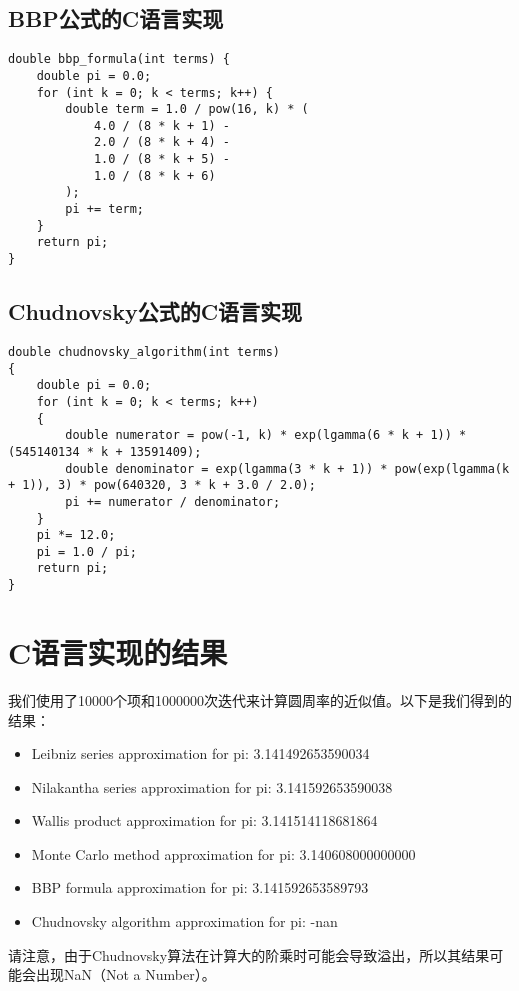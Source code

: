 \documentclass{ctexart}
\begin{document}
\subsection{BBP公式的C语言实现}
\begin{lstlisting}
double bbp_formula(int terms) {
    double pi = 0.0;
    for (int k = 0; k < terms; k++) {
        double term = 1.0 / pow(16, k) * (
            4.0 / (8 * k + 1) -
            2.0 / (8 * k + 4) -
            1.0 / (8 * k + 5) -
            1.0 / (8 * k + 6)
        );
        pi += term;
    }
    return pi;
}
\end{lstlisting}

\subsection{Chudnovsky公式的C语言实现}
\begin{lstlisting}
double chudnovsky_algorithm(int terms)
{
    double pi = 0.0;
    for (int k = 0; k < terms; k++)
    {
        double numerator = pow(-1, k) * exp(lgamma(6 * k + 1)) * (545140134 * k + 13591409);
        double denominator = exp(lgamma(3 * k + 1)) * pow(exp(lgamma(k + 1)), 3) * pow(640320, 3 * k + 3.0 / 2.0);
        pi += numerator / denominator;
    }
    pi *= 12.0;
    pi = 1.0 / pi;
    return pi;
}
\end{lstlisting}
\section{C语言实现的结果}

我们使用了10000个项和1000000次迭代来计算圆周率的近似值。以下是我们得到的结果：

\begin{itemize}
    \item Leibniz series approximation for pi: 3.141492653590034
    \item Nilakantha series approximation for pi: 3.141592653590038
    \item Wallis product approximation for pi: 3.141514118681864
    \item Monte Carlo method approximation for pi: 3.140608000000000
    \item BBP formula approximation for pi: 3.141592653589793
    \item Chudnovsky algorithm approximation for pi: -nan
\end{itemize}

请注意，由于Chudnovsky算法在计算大的阶乘时可能会导致溢出，所以其结果可能会出现NaN（Not a Number）。
\end{document}
